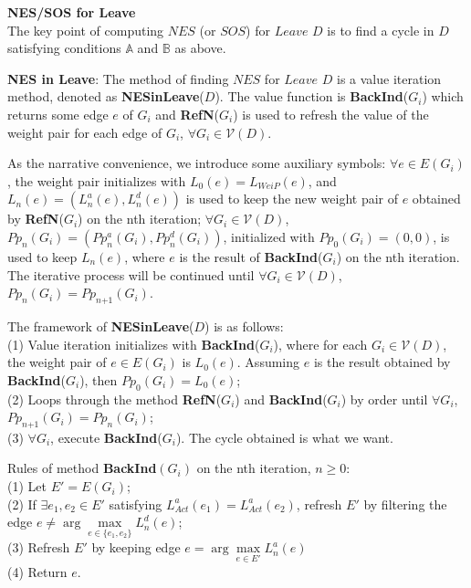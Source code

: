 \documentclass{acm_proc_article-sp}
\begin{document}
\textbf{NES/SOS for Leave}\\
The key point of computing $\textit{NES}$ (or $\textit{SOS}$) for $\textit{Leave}$ $D$ is to find a cycle in $D$ satisfying conditions $\mathds{A}$ and $\mathds{B}$ as above.

\textbf{NES in Leave}: The method of finding $\textit{NES}$ for $\textit{Leave}$ $D$ is a value iteration method, denoted as \textbf{NESinLeave}($D$). The value function is \textbf{BackInd}($G_{\textit{i}}$) which returns some edge $e$ of $G_{\textit{i}}$ and \textbf{RefN}($G_{\textit{i}}$) is used to refresh the value of the weight pair for each edge of $G_{\textit{i}}$, $\forall G_{\textit{i}}\in \mathcal{V}(D)$.

As the narrative convenience, we introduce some auxiliary symbols: $\forall e\in E(G_{\textit{i}})$, the weight pair initializes with $L_{0}(e)=L_{\textit{WeiP}}(e)$, and $L_{\textit{n}}(e)=(L_{\textit{n}}^a(e), L_{\textit{n}}^d(e))$ is used to keep the new weight pair of $e$ obtained by \textbf{RefN}($G_{\textit{i}}$) on the nth iteration; $\forall G_{\textit{i}}\in \mathcal{V}(D)$, $Pp_{\textit{n}}(G_{i})=(Pp_{\textit{n}}^a(G_{i}), Pp_{\textit{n}}^d(G_{i}))$, initialized with $Pp_0(G_{i})=(0,0)$, is used to keep $L_{\textit{n}}(e)$, where $e$ is the result of \textbf{BackInd}($G_{\textit{i}}$) on the nth iteration. The iterative process will be continued until $\forall G_{\textit{i}}\in \mathcal{V}(D)$, $Pp_{\textit{n}}(G_{i})=Pp_{\textit{n+1}}(G_{i})$.

The framework of \textbf{NESinLeave}($D$) is as follows:\\
(1) Value iteration initializes with \textbf{BackInd}($G_{\textit{i}}$), where for each $G_{\textit{i}}\in \mathcal{V}(D)$, the weight pair of $e\in E(G_{\textit{i}})$ is $L_0(e)$. Assuming $e$ is the result obtained by \textbf{BackInd}($G_{\textit{i}}$), then $Pp_0(G_{\textit{i}})=L_0(e)$;\\
(2) Loops through the method \textbf{RefN}($G_{\textit{i}}$) and \textbf{BackInd}($G_{\textit{i}}$) by order until $\forall G_{\textit{i}}$, $Pp_{\textit{n+1}}(G_{\textit{i}}) =Pp_{\textit{n}}(G_{\textit{i}})$;\\
(3) $\forall G_{\textit{i}}$, execute \textbf{BackInd}($G_{\textit{i}}$). The cycle obtained is what we want.

Rules of method \textbf{BackInd}$(G_{\textit{i}})$ on the nth iteration,  $n\geq0$:\\
(1) Let $E'=E(G_{\textit{i}})$;\\
(2) If $\exists e_1, e_2\in E'$ satisfying $L_{\textit{Act}}^a(e_1)=L_{\textit{Act}}^a(e_2)$, refresh $E'$ by filtering the edge $e\neq\arg\underset{e\in \{e_1,e_2\}}{\max} L_{n}^d(e)$;\\
(3) Refresh $E'$ by keeping edge $e=\arg\underset{e\in E'}{\max} L_{n}^a(e)$\\
(4) Return $e$.
\end{document}
